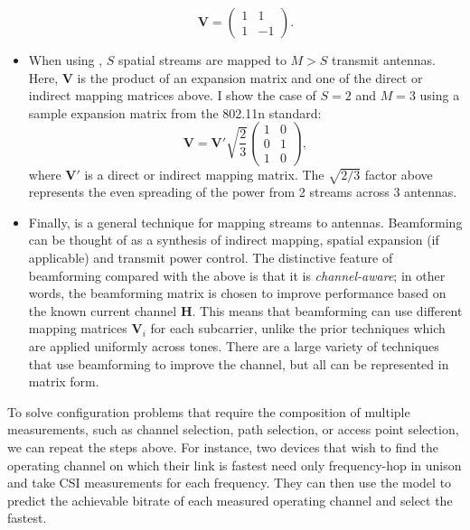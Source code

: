 \begin{itemize}[leftmargin=0.5cm,parsep=1ex,itemsep=1ex,topsep=1ex]
\begin{equation*}
		\tag{Atheros $2$x$2$}
		\mathbf{V} = \begin{pmatrix}
		1 & 1\\
		1 & -1
		\end{pmatrix}.
	\end{equation*}
%
	\item When using , $S$ spatial streams are mapped to $M > S$ transmit antennas. Here, $\mathbf{V}$ is the product of an expansion matrix and one of the direct or indirect mapping matrices above. I show the case of $S=2$ and $M=3$ using a sample expansion matrix from the 802.11n standard:
	\begin{equation*}
		\tag{$3$x$2$ Spatial Expansion}
		\mathbf{V} = \mathbf{V}'\sqrt{\frac{2}{3}}\begin{pmatrix}
		1 & 0\\
		0 & 1\\
		1 & 0
		\end{pmatrix},
	\end{equation*}
	where $\mathbf{V}'$ is a direct or indirect mapping matrix. The $\sqrt{2/3}$ factor above represents the even spreading of the power from 2 streams across 3 antennas.
%
	\item Finally,  is a general technique for mapping streams to antennas. Beamforming can be thought of as a synthesis of indirect mapping, spatial expansion (if applicable) and transmit power control. The distinctive feature of beamforming compared with the above is that it is \emph{channel-aware}; in other words, the beamforming matrix is chosen to improve performance based on the known current channel $\mathbf{H}$. This means that beamforming can use different mapping matrices $\mathbf{V}_i$ for each subcarrier, unlike the prior techniques which are applied uniformly across tones. There are a large variety of techniques that use beamforming to improve the channel, but all can be represented in matrix form.
\end{itemize}

 To solve configuration problems that require the composition of multiple measurements, such as channel selection, path selection, or access point selection, we can repeat the steps above. For instance, two devices that wish to find the operating channel on which their link is fastest need only frequency-hop in unison and take CSI measurements for each frequency. They can then use the model to predict the achievable bitrate of each measured operating channel and select the fastest.

